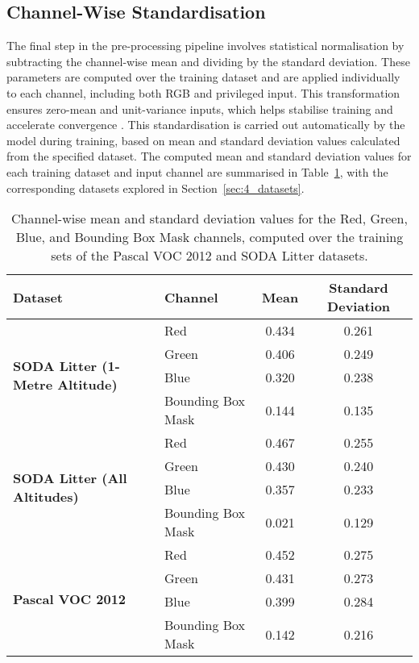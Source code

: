 \subsection{Channel-Wise Standardisation}
\label{subsec:4_standardisation}

The final step in the pre-processing pipeline involves statistical normalisation by subtracting the channel-wise mean and dividing by the standard deviation. These parameters are computed over the training dataset and are applied individually to each channel, including both RGB and privileged input. This transformation ensures zero-mean and unit-variance inputs, which helps stabilise training and accelerate convergence \cite{min_max_normalisation}. This standardisation is carried out automatically by the model during training, based on mean and standard deviation values calculated from the specified dataset. The computed mean and standard deviation values for each training dataset and input channel are summarised in Table~\ref{tab:channel_stats}, with the corresponding datasets explored in Section~\ref{sec:4_datasets}.

\begin{table}[ht]
    \centering
    \begin{tabular}{llcc}
        \toprule
        \textbf{Dataset} & \textbf{Channel} & \textbf{Mean} & \textbf{Standard Deviation} \\
        \midrule
        \multirow{4}{*}{\textbf{SODA Litter (1-Metre Altitude)}} 
            & Red               & 0.434 & 0.261 \\
            & Green             & 0.406 & 0.249 \\
            & Blue              & 0.320 & 0.238 \\
            & Bounding Box Mask & 0.144 & 0.135 \\
        \midrule
        \multirow{4}{*}{\textbf{SODA Litter (All Altitudes)}} 
            & Red               & 0.467 & 0.255 \\
            & Green             & 0.430 & 0.240 \\
            & Blue              & 0.357 & 0.233 \\
            & Bounding Box Mask & 0.021 & 0.129 \\
        \midrule
        \multirow{4}{*}{\textbf{Pascal VOC 2012}} 
            & Red               & 0.452 & 0.275 \\
            & Green             & 0.431 & 0.273 \\
            & Blue              & 0.399 & 0.284 \\
            & Bounding Box Mask & 0.142 & 0.216 \\
        \bottomrule
    \end{tabular}
    \caption{Channel-wise mean and standard deviation values for the Red, Green, Blue, and Bounding Box Mask channels, computed over the training sets of the Pascal VOC 2012 and SODA Litter datasets.}
    \label{tab:channel_stats}
\end{table}

